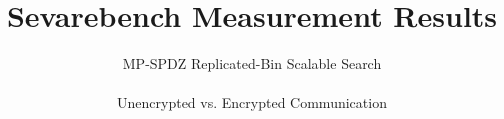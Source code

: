 \documentclass[8pt]{beamer}
\title{Sevarebench Measurement Results}
\subtitle{MP-SPDZ Replicated-Bin Scalable Search\\ \hfill \\
Unencrypted vs. Encrypted Communication}
\begin{document}
	\frame {
		\titlepage
	}

    
\end{document}
